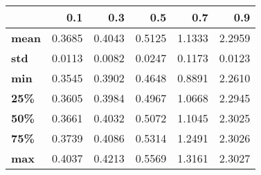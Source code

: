 \begin{tabular}{lrrrrr}
\toprule
{} &     0.1 &     0.3 &     0.5 &     0.7 &     0.9 \\
\midrule
\textbf{mean} &  0.3685 &  0.4043 &  0.5125 &  1.1333 &  2.2959 \\
\textbf{std } &  0.0113 &  0.0082 &  0.0247 &  0.1173 &  0.0123 \\
\textbf{min } &  0.3545 &  0.3902 &  0.4648 &  0.8891 &  2.2610 \\
\textbf{25\% } &  0.3605 &  0.3984 &  0.4967 &  1.0668 &  2.2945 \\
\textbf{50\% } &  0.3661 &  0.4032 &  0.5072 &  1.1045 &  2.3025 \\
\textbf{75\% } &  0.3739 &  0.4086 &  0.5314 &  1.2491 &  2.3026 \\
\textbf{max } &  0.4037 &  0.4213 &  0.5569 &  1.3161 &  2.3027 \\
\bottomrule
\end{tabular}

